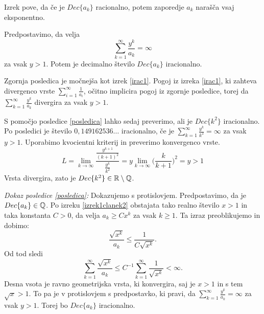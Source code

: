\documentclass[twoside,11pt]{article}
\begin{document}
Izrek pove, da če je $Dec\{a_k\}$ racionalno, potem zaporedje $a_k$ narašča vsaj eksponentno.

\begin{posledica}
    \label{posledica}
    Predpostavimo, da velja
    \[
        \sum_{k=1}^{\infty}\frac{y^k}{a_k} = \infty\]
    za vsak $y > 1$. Potem je decimalno število $Dec\{a_k\}$ iracionalno.
\end{posledica}

Zgornja posledica je močnejša kot izrek \ref{irac1}. 
Pogoj iz izreka \ref{irac1}, ki zahteva divergenco vrste
$\sum_{i=1}^{\infty} \frac{1}{a_i}$, očitno implicira
pogoj iz zgornje posledice, torej da $\sum_{k=1}^{\infty}\frac{y^k}{a_k}$
divergira za vsak $y > 1$.


\begin{zgled}
    S pomočjo posledice \ref{posledica} lahko sedaj preverimo, ali je $Dec\{k^2\}$ iracionalno.
    Po posledici je število $0,149162536\dots$ iracionalno, če je $\sum_{k=1}^{\infty}\frac{y^k}{k^2} = \infty$
    za vsak $y > 1$. Uporabimo kvocientni kriterij in preverimo konvergenco vrste.
    \[
        L = \lim_{k \rightarrow \infty} \frac{\frac{y^{k+1}}{(k+1)^2}}{\frac{y^k}{k^2}}
        = y \lim_{k \rightarrow \infty} \big (\frac{k}{k + 1}\big)^2 = y > 1
    \]
    Vrsta divergira, zato je $Dec\{k^2\} \in \mathbb{R} \setminus \mathbb{Q}$.
\end{zgled}

\noindent
{\em Dokaz posledice \ref{posledica}:\/}
Dokazujemo s protislovjem. Predpostavimo, da je $Dec\{a_k\} \in \mathbb{Q}$.
Po izreku \ref{izrek1clanek2} obstajata tako realno število $x > 1$ in taka konstanta $C>0$, da velja
$a_k \geq Cx^k$ za vsak $k \geq 1$. Ta izraz preoblikujemo in dobimo:
\[
    \frac{\sqrt{x^k}}{a_k} \leq \frac{1}{C\sqrt{x^k}}.\] 
Od tod sledi
\[ \sum_{k=1}^{\infty} \frac{\sqrt{x^k}}{a_k} \leq C^{-1} \sum_{k=1}^{\infty} \frac{1}{\sqrt{x^k}} < \infty.\]
Desna vsota je ravno geometrijska vrsta, ki konvergira, saj je $x > 1$ in s tem $\sqrt{x} > 1$.
To pa je v protislovjem s predpostavko, ki pravi, da $\sum_{k=1}^{\infty}\frac{y^k}{a_k} = \infty$ za vsak $y>1$.
Torej bo $Dec\{a_k\}$ iracionalno.
\end{document}
